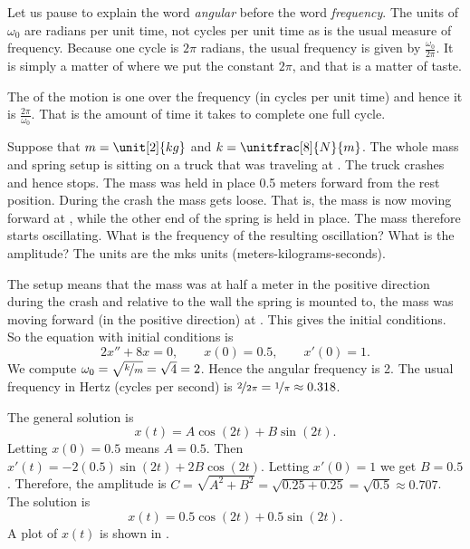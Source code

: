 Let us pause to explain the word \emph{angular}
before the word \emph{frequency}.
The units of
$\omega_0$ are radians per unit time, not cycles per unit time 
as is the usual measure of frequency.  Because one cycle is $2
\pi$ radians, the usual frequency is given by $\frac{\omega_0}{2\pi}$.
It is simply a matter of where we put the constant $2\pi$, and that is a
matter of taste.

The \emph{} of the motion is one over the frequency (in cycles per unit
time) and hence it is $\frac{2\pi}{\omega_0}$.  That is the amount of time it takes
to complete one full cycle.


\begin{example}
Suppose that $m=\unit[2]{kg}$ and $k=\unitfrac[8]{N}{m}$.
The whole mass and spring setup is sitting on
a truck that was traveling at .
The truck crashes and hence stops.
The mass was held in place 0.5 meters forward from the rest position.  During
the crash the mass gets loose.  That is, the mass is now 
moving forward at , while the other end of the
spring is held
in place.  The mass therefore starts oscillating.
What is the frequency of the resulting oscillation?  What is the amplitude?
The units are the mks units (meters-kilograms-seconds).

The setup means that the mass was at half a meter in the positive
direction during the crash and
relative to the wall the spring is mounted to, the mass was moving forward
(in the positive direction) at .  This gives the initial
conditions.
So the equation with initial conditions is
\begin{equation*}
2 x'' + 8 x = 0 , \qquad x(0) = 0.5, \qquad x'(0) = 1.
\end{equation*}
We compute $\omega_0 = \sqrt{\nicefrac{k}{m}} = \sqrt{4} = 2$.
Hence the angular frequency is 2.  The usual frequency in Hertz (cycles per
second) is $\nicefrac{2}{2\pi} = \nicefrac{1}{\pi} \approx 0.318$.

The general solution is
\begin{equation*}
x(t) = A \cos (2t) + B \sin (2t) .
\end{equation*}
Letting $x(0) = 0.5$ means $A = 0.5$.  Then $x'(t) = - 2(0.5) \sin (2t)
+ 2B \cos (2t)$.
Letting $x'(0) = 1$ we get $B = 0.5$.  Therefore, the amplitude is
$C = \sqrt{A^2+B^2} = \sqrt{0.25+0.25} = \sqrt{0.5} \approx 0.707$.  The solution is
\begin{equation*}
x(t) = 0.5 \cos (2t) + 0.5 \sin (2t) .
\end{equation*}
A plot of $x(t)$ is shown in .
\end{example}

